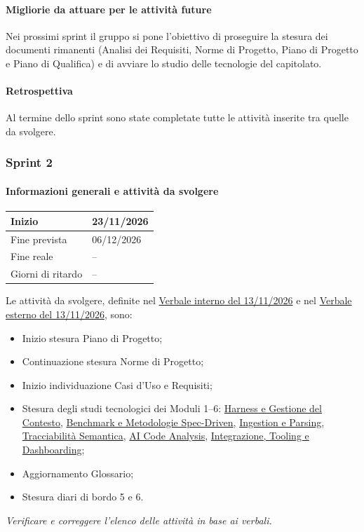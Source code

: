 \documentclass[a4paper, 11pt]{article}
\newcommand{\vint}[3]{\href{https://raw.githubusercontent.com/0x06tudio/docs/main/out/verbali/interni/vi_#1_#2_#3.pdf}{Verbale interno del #3/#2/#1}}
\newcommand{\vest}[3]{\href{https://raw.githubusercontent.com/0x06tudio/docs/main/out/verbali/esterni/ve_#1_#2_#3.pdf}{Verbale esterno del #3/#2/#1}}
\newcommand{\studio}[2]{\href{https://raw.githubusercontent.com/0x06tudio/docs/main/out/RTB/tecnologie_esplorative/#1}{#2}}
\newcommand{\tbd}[1]{\colorbox{yellow!60}{#1}}
\begin{document}
\paragraph{Migliorie da attuare per le attività future}
Nei prossimi sprint il gruppo si pone l'obiettivo di proseguire la stesura dei documenti rimanenti (Analisi dei Requisiti, Norme di Progetto, Piano di Progetto e Piano di Qualifica) e di avviare lo studio delle tecnologie del capitolato.

\paragraph{Retrospettiva}
Al termine dello sprint \tbd{sono state completate tutte le attività inserite tra quelle da svolgere}.

\subsubsection{Sprint 2}

\paragraph{Informazioni generali e attività da svolgere}
\begin{table}[H]
\centering
\begin{tabular}{|l|l|}
    \hline
    Inizio & 23/11/2026 \\ \hline
    Fine prevista & 06/12/2026 \\ \hline
    Fine reale & -- \\ \hline
    Giorni di ritardo & -- \\ \hline
\end{tabular}
\end{table}

Le attività da svolgere, definite nel \vint{2026}{11}{13} e nel \vest{2026}{11}{13}, sono:
\begin{itemize}[noitemsep]
    \item Inizio stesura Piano di Progetto;
    \item Continuazione stesura Norme di Progetto;
    \item Inizio individuazione Casi d'Uso e Requisiti;
    \item Stesura degli studi tecnologici dei Moduli 1--6: \studio{studio_tecnologico_harness_e_opencode.pdf}{Harness e Gestione del Contesto}, \studio{Benchmark_SpecCheck.pdf}{Benchmark e Metodologie Spec-Driven}, \studio{ingestion_parsing.pdf}{Ingestion e Parsing}, \studio{tracciabilita_semantica.pdf}{Tracciabilità Semantica}, \studio{Studio_Tecnologico_Modulo5_AI_Code_Analysis.pdf}{AI Code Analysis}, \studio{architettura_integrazione_tooling_dashboarding.pdf}{Integrazione, Tooling e Dashboarding};
    \item Aggiornamento Glossario;
    \item Stesura diari di bordo \tbd{5 e 6}.
\end{itemize}
\textit{\tbd{Verificare e correggere l'elenco delle attività in base ai verbali.}}
\end{document}
